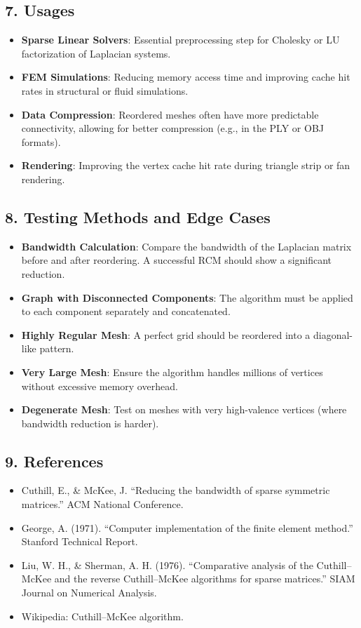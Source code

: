 \subsection{7. Usages}

\begin{itemize}
    \item \textbf{Sparse Linear Solvers}: Essential preprocessing step for Cholesky or LU factorization of Laplacian systems.
    \item \textbf{FEM Simulations}: Reducing memory access time and improving cache hit rates in structural or fluid simulations.
    \item \textbf{Data Compression}: Reordered meshes often have more predictable connectivity, allowing for better compression (e.g., in the PLY or OBJ formats).
    \item \textbf{Rendering}: Improving the vertex cache hit rate during triangle strip or fan rendering.
\end{itemize}

\subsection{8. Testing Methods and Edge Cases}

\begin{itemize}
    \item \textbf{Bandwidth Calculation}: Compare the bandwidth of the Laplacian matrix before and after reordering. A successful RCM should show a significant reduction.
    \item \textbf{Graph with Disconnected Components}: The algorithm must be applied to each component separately and concatenated.
    \item \textbf{Highly Regular Mesh}: A perfect grid should be reordered into a diagonal-like pattern.
    \item \textbf{Very Large Mesh}: Ensure the algorithm handles millions of vertices without excessive memory overhead.
    \item \textbf{Degenerate Mesh}: Test on meshes with very high-valence vertices (where bandwidth reduction is harder).
\end{itemize}

\subsection{9. References}

\begin{itemize}
    \item Cuthill, E., \& McKee, J. \cite{cuthill1969} ``Reducing the bandwidth of sparse symmetric matrices.'' ACM National Conference.
    \item George, A. (1971). ``Computer implementation of the finite element method.'' Stanford Technical Report.
    \item Liu, W. H., \& Sherman, A. H. (1976). ``Comparative analysis of the Cuthill--McKee and the reverse Cuthill--McKee algorithms for sparse matrices.'' SIAM Journal on Numerical Analysis.
    \item Wikipedia: Cuthill--McKee algorithm.
\end{itemize}

